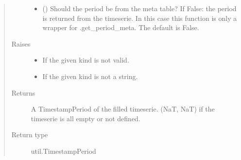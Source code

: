 \documentclass[letterpaper,10pt,english]{sphinxmanual}
\begin{document}
\begin{fulllineitems}
\begin{fulllineitems}
\begin{quote}
\begin{description}
\begin{itemize}
\item {} 
\sphinxAtStartPar
{} (\sphinxstyleliteralemphasis{\sphinxupquote{, }}) \textendash{} Should the period be from the meta table?
If False: the period is returned from the timeserie. In this case this function is only a wrapper for .get\_period\_meta.
The default is False.

\end{itemize}

\item[{Raises}] \leavevmode\begin{itemize}
\item {} 
\sphinxAtStartPar
{} \textendash{} If the given kind is not valid.

\item {} 
\sphinxAtStartPar
{} \textendash{} If the given kind is not a string.

\end{itemize}

\item[{Returns}] \leavevmode
\sphinxAtStartPar
A TimestampPeriod of the filled timeserie.
(NaT, NaT) if the timeserie is all empty or not defined.

\item[{Return type}] \leavevmode
\sphinxAtStartPar
util.TimestampPeriod

\end{description}\end{quote}

\end{fulllineitems}



\end{fulllineitems}
\end{document}
